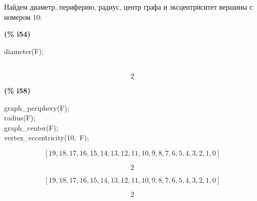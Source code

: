 \documentclass[fleqn]{article}
\begin{document}
Найдем диаметр, периферию, радиус, центр графа и эксцентриситет вершины с номером 10:\\
\noindent
\begin{minipage}[t]{4.000000em}\color{red}\bfseries
(\% i54)	
\end{minipage}
\begin{minipage}[t]{\textwidth}\color{blue}
diameter(F);\\
\\

\end{minipage}
\[\displaystyle \tag{\% o54} 
2\mbox{}
\]


\noindent
\begin{minipage}[t]{4.000000em}\color{red}\bfseries
(\% i58)	
\end{minipage}
\begin{minipage}[t]{\textwidth}\color{blue}
graph\_periphery(F);\\
radius(F);\\
graph\_center(F);\\
vertex\_eccentricity(10,\ F);
\end{minipage}
\[\displaystyle \tag{\% o55} 
\left[ 19\operatorname{,}18\operatorname{,}17\operatorname{,}16\operatorname{,}15\operatorname{,}14\operatorname{,}13\operatorname{,}12\operatorname{,}11\operatorname{,}10\operatorname{,}9\operatorname{,}8\operatorname{,}7\operatorname{,}6\operatorname{,}5\operatorname{,}4\operatorname{,}3\operatorname{,}2\operatorname{,}1\operatorname{,}0\right] \mbox{}\]

\[\tag{\% o56} 
2
\mbox{}\]

\[\tag{\% o57} 
\left[ 19\operatorname{,}18\operatorname{,}17\operatorname{,}16\operatorname{,}15\operatorname{,}14\operatorname{,}13\operatorname{,}12\operatorname{,}11\operatorname{,}10\operatorname{,}9\operatorname{,}8\operatorname{,}7\operatorname{,}6\operatorname{,}5\operatorname{,}4\operatorname{,}3\operatorname{,}2\operatorname{,}1\operatorname{,}0\right] \mbox{}\]

\[\tag{\% o58} 
2\mbox{}
\]
\end{document}
